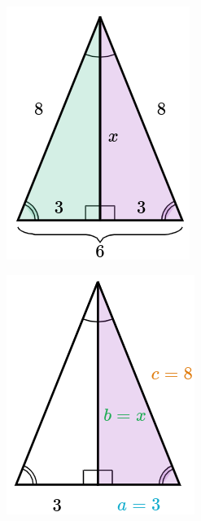 \begin{solutionbox}{15cm}
    \begin{minipage}{0.3\textwidth}
        \begin{figure}[H]
            \centering
            \includegraphics[width=0.6\linewidth]{../images/pitagoras0a.png}
            \caption{}
            \label{fig:pitagoras0a}
        \end{figure}
        \begin{figure}[H]
            \centering
            \includegraphics[width=0.6\linewidth]{../images/pitagoras0b.png}
            \caption{}
            \label{fig:pitagoras0b}

\end{figure}
\end{minipage}
\end{solutionbox}
